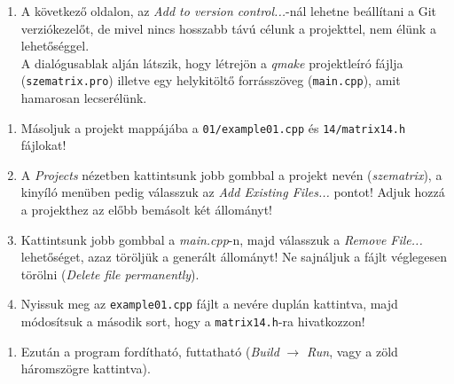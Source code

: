 \begin{frame}
  \begin{enumerate}
    \setcounter{enumi}{\theqt}
    \item A következő oldalon, az \emph{Add to version control...}-nál lehetne beállítani a Git verziókezelőt, de mivel nincs hosszabb távú célunk a projekttel, nem élünk a lehetőséggel.\\
    A dialógusablak alján látszik, hogy létrejön a \emph{qmake} projektleíró fájlja (\texttt{szematrix.pro}) illetve egy helykitöltő forrásszöveg (\texttt{main.cpp}), amit hamarosan lecserélünk.\\
    \setcounter{qt}{\theenumi}
  \end{enumerate}
\end{frame}

\begin{frame}
  \begin{enumerate}
    \setcounter{enumi}{\theqt}
    \item Másoljuk a projekt mappájába a \texttt{01/example01.cpp} és \texttt{14/matrix14.h} fájlokat!
    \item A \emph{Projects} nézetben kattintsunk jobb gombbal a projekt nevén (\emph{szematrix}), a kinyíló menüben pedig válasszuk az \emph{Add Existing Files...} pontot! Adjuk hozzá a projekthez az előbb bemásolt két állományt!
    \item Kattintsunk jobb gombbal a \emph{main.cpp}-n, majd válasszuk a \emph{Remove File...} lehetőséget, azaz töröljük a generált állományt! Ne sajnáljuk a fájlt véglegesen törölni (\emph{Delete file permanently}).
    \item Nyissuk meg az \texttt{example01.cpp} fájlt a nevére duplán kattintva, majd módosítsuk a második sort, hogy a \texttt{matrix14.h}-ra hivatkozzon!
    \setcounter{qt}{\theenumi}
  \end{enumerate}
\end{frame}

\begin{frame}
  \begin{enumerate}
    \setcounter{enumi}{\theqt}
    \item Ezután a program fordítható, futtatható (\emph{Build} $\to$ \emph{Run}, vagy a zöld háromszögre kattintva).\\
    \setcounter{qt}{\theenumi}
  \end{enumerate}
\end{frame}

